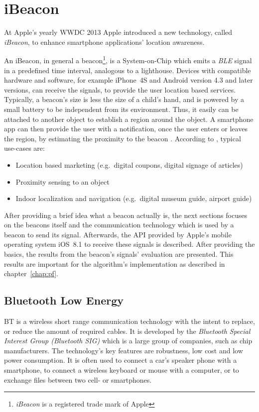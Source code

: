 \chapter{iBeacon} \label{chap:ibeacons}
At Apple's yearly \ac{WWDC} 2013 Apple introduced a new technology, called \emph{iBeacon}, to enhance smartphone applications' location awareness.

An iBeacon, in general a beacon\footnote{\emph{iBeacon} is a registered trade mark of Apple}, is a System-on-Chip which emits a \emph{\acl{BLE}} signal in a predefined time interval, analogous to a lighthouse. Devices with compatible hardware and software, for example iPhone~4S and Android version 4.3 and later versions, can receive the signals, to provide the user location based services. Typically, a beacon's size is less the size of a child's hand, and is powered by a small battery to be independent from its environment. Thus, it easily can be attached to another object to establish a region around the object. A smartphone app can then provide the user with a notification, once the user enters or leaves the region, by estimating the proximity to the beacon \citep{apple:getting_started,binside:ds}. According to \citet{binside:ds}, typical use-cases are:
\begin{itemize}
  \item Location based marketing (e.g.\ digital coupons, digital signage of articles)
  \item Proximity sensing to an object
  \item Indoor localization and navigation (e.g.\ digital museum guide, airport guide)
\end{itemize}

\noindent After providing a brief idea what a beacon actually is, the next sections focuses on the beacons itself and the communication technology which is used by a beacon to send its signal. Afterwards, the \acs{API} provided by Apple's mobile operating system iOS~8.1 to receive these signals is described. After providing the basics, the results from the beacon's signals' evaluation are presented. This results are important for the algorithm's implementation as described in chapter~\ref{chap:pf}.


\section{Bluetooth Low Energy}\label{sec:ble}
\ac{BT} is a wireless short range communication technology with the intent to replace, or reduce the amount of required cables. It is developed by the \emph{Bluetooth Special Interest Group (Bluetooth SIG)} which is a large group of companies, such as chip manufacturers. The technology's key features are robustness, low cost and low power consumption. It is often used to connect a car's speaker phone with a smartphone, to connect a wireless keyboard or mouse with a computer, or to exchange files between two cell- or smartphones.

